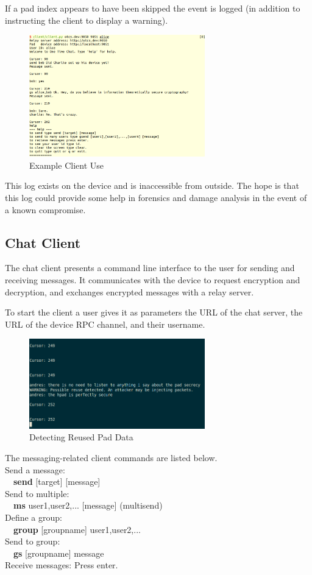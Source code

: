 \documentclass[twocolumn]{article}
\begin{document}
If a pad index appears to have been skipped the event is logged
(in addition to instructing the client
to display a warning).

\begin{figure}[htp]
\centering
\includegraphics[width=3in]{sample}
\caption{Example Client Use}
\end{figure}
\label{sec:clientexample}

This log exists on the device and is inaccessible from outside.
The hope is that this log could provide some help in forensics
and damage analysis in the event of a known compromise.


\subsection{Chat Client}
The chat client presents a command line interface to the user for sending and receiving messages. It communicates with the device to request encryption and decryption, and exchanges encrypted messages with a relay server.

To start the client a user gives it as parameters the URL of the chat server, the URL of the device RPC channel, and their username.

\begin{figure}[htp]
\centering
\includegraphics[width=3in]{reuse}
\caption{Detecting Reused Pad Data}
\end{figure}

The messaging-related client commands are listed below.\\
Send a message:\\
\-\ \-\ \textbf{send} [target] [message]\\
Send to multiple:\\
\-\ \-\ \textbf{ms} user1,user2,... [message] (multisend)\\
Define a group:\\
\-\ \-\ \textbf{group} [groupname] user1,user2,...\\
Send to group:\\
\-\ \-\ \textbf{gs} [groupname] message\\
Receive messages:
Press enter.
\end{document}
